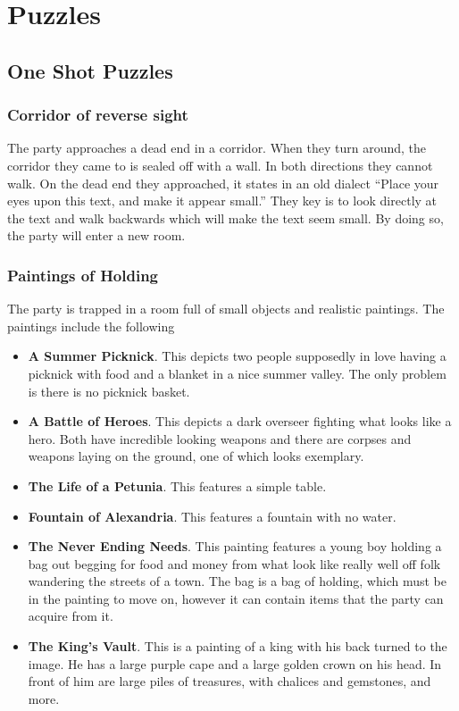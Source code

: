 \chapter{Puzzles}

\section{One Shot Puzzles}

\subsection{Corridor of reverse sight}

The party approaches a dead end in a corridor. When they turn around, the corridor they came to is sealed off with a wall. In both directions they cannot walk. On the dead end they approached, it states in an old dialect ``Place your eyes upon this text, and make it appear small.'' They key is to look directly at the text and walk backwards which will make the text seem small. By doing so, the party will enter a new room.


\subsection{Paintings of Holding}

The party is trapped in a room full of small objects and realistic paintings. The paintings include the following

\begin{itemize}
	\item \textbf{A Summer Picknick}. This depicts two people supposedly in love having a picknick with food and a blanket in a nice summer valley. The only problem is there is no picknick basket.
	\item \textbf{A Battle of Heroes}. This depicts a dark overseer fighting what looks like a hero. Both have incredible looking weapons and there are corpses and weapons laying on the ground, one of which looks exemplary.
	\item \textbf{The Life of a Petunia}. This features a simple table.
	\item \textbf{Fountain of Alexandria}. This features a fountain with no water.
	\item \textbf{The Never Ending Needs}. This painting features a young boy holding a bag out begging for food and money from what look like really well off folk wandering the streets of a town. The bag is a bag of holding, which must be in the painting to move on, however it can contain items that the party can acquire from it.
	\item \textbf{The King's Vault}. This is a painting of a king with his back turned to the image. He has a large purple cape and a large golden crown on his head. In front of him are large piles of treasures, with chalices and gemstones, and more.
\end{itemize}

